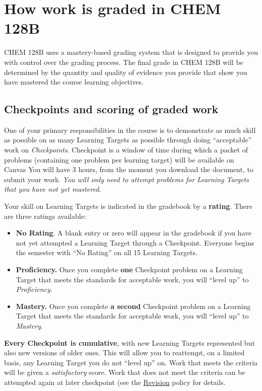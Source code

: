 \hypertarget{grading}{%
\section{How work is graded in CHEM 128B}\label{grading}}

CHEM 128B uses a mastery-based grading system that is designed to
provide you with control over the grading process. The final grade in
CHEM 128B will be determined by the quantity and quality of evidence you
provide that show you have mastered the course learning objectives.

\hypertarget{checkpoints-and-scoring-of-graded-work}{%
\subsection{Checkpoints and scoring of graded
work}\label{checkpoints-and-scoring-of-graded-work}}

One of your primary responsibilities in the course is to demonstrate as
much skill as possible on as many Learning Targets as possible through
doing ``acceptable'' work on \emph{Checkpoints}. Checkpoint is a window
of time during which a packet of problems (containing one problem per
learning target) will be available on Canvas You will have 3 hours, from
the moment you download the document, to submit your work. \emph{You
will only need to attempt problems for Learning Targets that you have
not yet mastered}.

Your skill on Learning Targets is indicated in the gradebook by a
\textbf{rating}. There are three ratings available:

\begin{itemize}
\tightlist
\item
  \textbf{No Rating}. A blank entry or zero will appear in the gradebook
  if you have not yet attempted a Learning Target through a Checkpoint.
  Everyone begins the semester with ``No Rating'' on all 15 Learning
  Targets.
\item
  \textbf{Proficiency.} Once you complete \textbf{one} Checkpoint
  problem on a Learning Target that meets the standards for acceptable
  work, you will ``level up'' to \emph{Proficiency}.
\item
  \textbf{Mastery.} Once you complete \textbf{a second} Checkpoint
  problem on a Learning Target that meets the standards for acceptable
  work, you will ``level up'' to \emph{Mastery}.
\end{itemize}

\textbf{Every Checkpoint is cumulative}, with new Learning Targets
represented but also new versions of older ones. This will allow you to
reattempt, on a limited basis, any Learning Target you do not ``level
up'' on. Work that meets the criteria will be given a
\emph{satisfactory} score. Work that does not meet the criteria can be
attempted again at later checkpoint (see the \href{revisions}{Revision}
policy for details.

